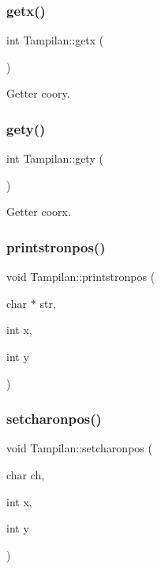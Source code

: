 \subsubsection{\texorpdfstring{getx()}{getx()}}
{\footnotesize\ttfamily int Tampilan\+::getx (\begin{DoxyParamCaption}{ }\end{DoxyParamCaption})}



Getter coory. 

\mbox{\label{classTampilan_abc150afa98710a4b9f4599f3dd798269}} 
\subsubsection{\texorpdfstring{gety()}{gety()}}
{\footnotesize\ttfamily int Tampilan\+::gety (\begin{DoxyParamCaption}{ }\end{DoxyParamCaption})}



Getter coorx. 

\mbox{\label{classTampilan_aaab4834dd6d5d198abf824d8360d1270}} 
\subsubsection{\texorpdfstring{printstronpos()}{printstronpos()}}
{\footnotesize\ttfamily void Tampilan\+::printstronpos (\begin{DoxyParamCaption}\item[{char $\ast$}]{str,  }\item[{int}]{x,  }\item[{int}]{y }\end{DoxyParamCaption})}

\mbox{\label{classTampilan_a39b78d35193b89db5e4d191b596b7734}} 
\subsubsection{\texorpdfstring{setcharonpos()}{setcharonpos()}}
{\footnotesize\ttfamily void Tampilan\+::setcharonpos (\begin{DoxyParamCaption}\item[{char}]{ch,  }\item[{int}]{x,  }\item[{int}]{y }\end{DoxyParamCaption})}

